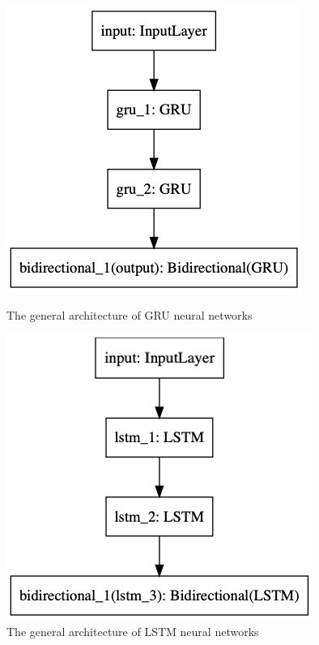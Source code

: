 \begin{figure}[h]
\centering
\begin{minipage}{.45\textwidth}
  \centering
  \includegraphics[width=1\linewidth]{./img/gru_architecture.png}
  \caption{The general architecture of GRU neural networks}
  \label{fig:gru_architecture}
\end{minipage}%
 \vspace{1cm}
\begin{minipage}{.45\textwidth}
  \centering
  \includegraphics[width=1\linewidth]{./img/lstm_architecture.png}
  \caption{The general architecture of LSTM neural networks}
  \label{fig:lstm_architecture}
\end{minipage}
\end{figure}\label{fig:nn_architectures}

